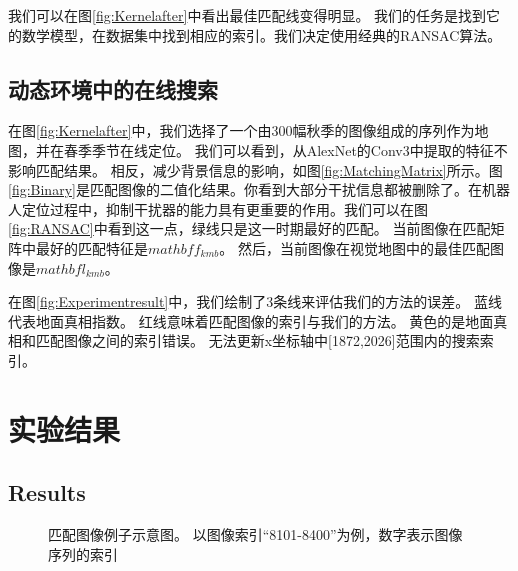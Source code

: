 我们可以在图\ref{fig:Kernelafter}中看出最佳匹配线变得明显。 我们的任务是找到它的数学模型，在数据集中找到相应的索引。我们决定使用经典的RANSAC算法。 

\subsection{动态环境中的在线搜索}
在图\ref{fig:Kernelafter}中，我们选择了一个由300幅秋季的图像组成的序列作为地图，并在春季季节在线定位。 我们可以看到，从AlexNet的Conv3中提取的特征不影响匹配结果。 相反，减少背景信息的影响，如图\ref{fig:MatchingMatrix}所示。图\ref{fig:Binary}是匹配图像的二值化结果。你看到大部分干扰信息都被删除了。在机器人定位过程中，抑制干扰器的能力具有更重要的作用。我们可以在图\ref{fig:RANSAC}中看到这一点，绿线只是这一时期最好的匹配。 当前图像在匹配矩阵中最好的匹配特征是$mathbf{f}_{kmb}$。 然后，当前图像在视觉地图中的最佳匹配图像是$mathbf{l}_{kmb}$。

在图\ref{fig:Experimentresult}中，我们绘制了3条线来评估我们的方法的误差。 蓝线代表地面真相指数。 红线意味着匹配图像的索引与我们的方法。 黄色的是地面真相和匹配图像之间的索引错误。 无法更新x坐标轴中[1872,2026]范围内的搜索索引。

\section{实验结果}

\subsection{Results} 
\begin{figure}[H]
 \centering
 \caption{ 匹配图像例子示意图。 以图像索引“8101-8400”为例，数字表示图像序列的索引}
 \label{ref:dimensions}
\end{figure}


